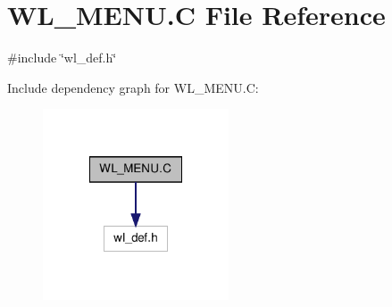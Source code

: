 \hypertarget{WL__MENU_8C}{
\section{WL\_\-MENU.C File Reference}
\label{WL__MENU_8C}
}
{\ttfamily \#include \char`\"{}wl\_\-def.h\char`\"{}}\par
Include dependency graph for WL\_\-MENU.C:
\nopagebreak
\begin{figure}[H]
\begin{center}
\leavevmode
\includegraphics[width=156pt]{WL__MENU_8C__incl}
\end{center}
\end{figure}
